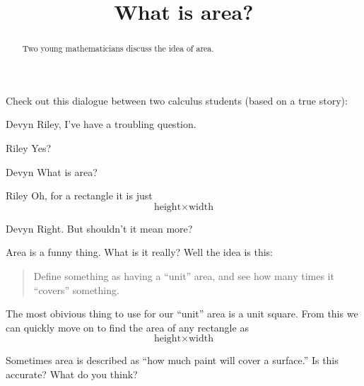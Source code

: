 \documentclass{ximera}
\title[Break-Ground:]{What is area?}
\begin{document}
\begin{abstract}
Two young mathematicians discuss the idea of area.
\end{abstract}
\maketitle




Check out this dialogue between two calculus students (based on a true
story):

\begin{dialogue}
\item[Devyn] Riley, I've have a troubling question.
\item[Riley] Yes? 
\item[Devyn] What is area?
\item[Riley] Oh, for a rectangle it is just
  \[
  \text{height}
  \times
  \text{width}
  \]
\item[Devyn] Right. But shouldn't it mean more?
\end{dialogue}

Area is a funny thing. What is it really? Well the idea is this:
\begin{quote}
Define something as having a ``unit'' area, and see how many times it
``covers'' something.
\end{quote}
The most obivious thing to use for our ``unit'' area is a unit
square. From this we can quickly move on to find the area of any
rectangle as
  \[
  \text{height}
  \times
  \text{width}
  \]
\begin{problem}
  Sometimes area is described as ``how much paint will cover a surface.''
  Is this accurate? What do you think?
  \begin{freeResponse}
  \end{freeResponse}
\end{problem}
%
\end{document}
